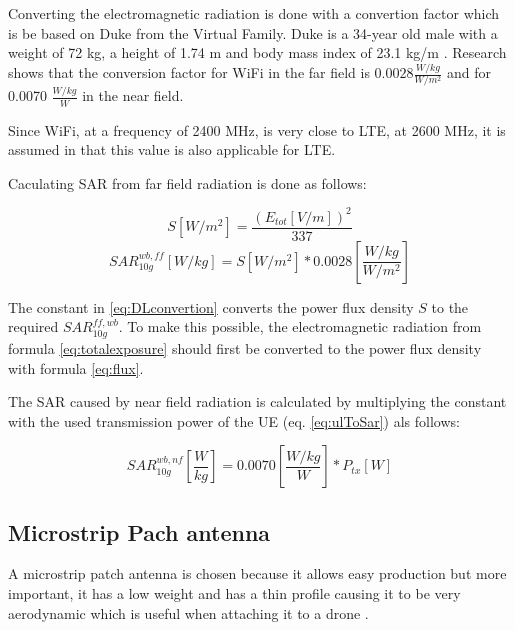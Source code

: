 \documentclass[twocolumn]{phdsymp} %
\begin{document}
Converting the electromagnetic radiation is done with a convertion factor which is be based 
on Duke from the Virtual Family. Duke is a 34-year old male with a weight of 72 kg, a height of 1.74 m and body
mass index of 23.1 kg/m \cite{J22_plets2015joint}. 
Research shows that the conversion factor for WiFi in the far field is $0.0028 \frac{W/kg}{W/m^2}$
and for 0.0070 $\frac{W/kg}{W}$ \cite{J22_plets2015joint} in the near field.

Since WiFi, at a frequency of 2400 MHz,
is very close to LTE, at 2600 MHz, it is assumed in \cite{J22_plets2015joint} that this value is also applicable for \gls{LTE}.

Caculating \gls{SAR} from far field radiation is done as follows:

\begin{equation}
S [W/m^2]= \frac{(E_{tot} [V/m])^2}{337}
\label{eq:flux}
\end{equation}
\begin{equation}
SAR^{wb,ff}_{10g} [W/kg]= S [W/m^2]* 0.0028 \left[\frac{W/kg}{W/m^2}\right]
\label{eq:DLconvertion}
\end{equation}

The constant in \ref{eq:DLconvertion} converts the \gls{power flux density} $S$ to the required $SAR^{ff,wb}_{10g}$.
To make this possible, the electromagnetic radiation
from formula \ref{eq:totalexposure} should first be converted to the  \gls{power flux density} with formula 
\ref{eq:flux}.

The SAR caused by near field radiation is calculated by multiplying the constant with the used transmission
power of the \gls{UE} (eq. \ref{eq:ulToSar}) 
als follows:

\begin{equation} 
SAR^{wb,nf}_{10g} \left[\frac{W}{kg}\right] = 0.0070 \left[\frac{W/kg}{W}\right] * P_{tx} [W]
\label{eq:ulToSar}
\end{equation}

\subsection{Microstrip Pach antenna}
A microstrip patch antenna is chosen because it allows easy production but more important, it has a low weight 
and has a thin profile causing it to be very aerodynamic which is useful when attaching it to a drone \cite{J13_microstripadvantages}.
\end{document}
